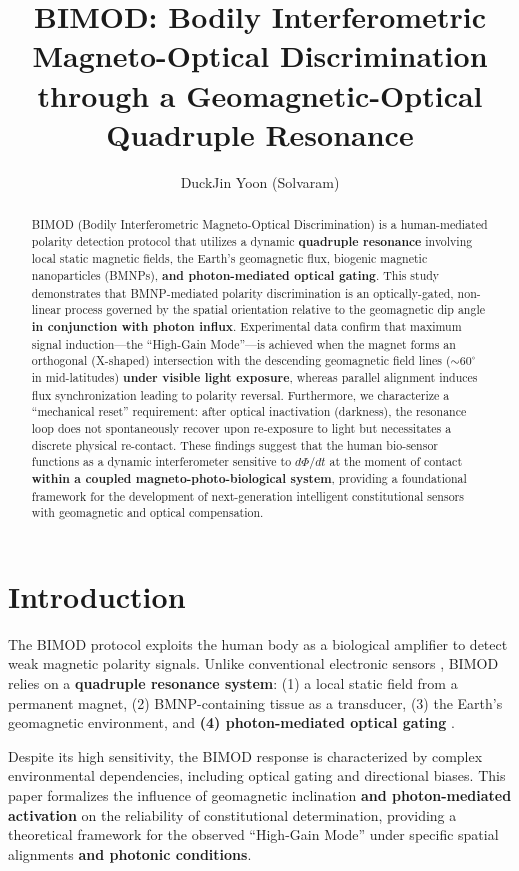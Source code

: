 \documentclass[12pt]{article}
\title{BIMOD: Bodily Interferometric Magneto-Optical Discrimination through a Geomagnetic-Optical Quadruple Resonance}
\author{DuckJin Yoon (Solvaram)}
\date{}
\begin{document}
\maketitle

\begin{abstract}
BIMOD (Bodily Interferometric Magneto-Optical Discrimination) is a human-mediated polarity detection protocol that utilizes a dynamic \textbf{quadruple resonance} involving local static magnetic fields, the Earth's geomagnetic flux, biogenic magnetic nanoparticles (BMNPs), \textbf{and photon-mediated optical gating}. This study demonstrates that BMNP-mediated polarity discrimination is an optically-gated, non-linear process governed by the spatial orientation relative to the geomagnetic dip angle \textbf{in conjunction with photon influx}. Experimental data confirm that maximum signal induction—the ``High-Gain Mode''—is achieved when the magnet forms an orthogonal (X-shaped) intersection with the descending geomagnetic field lines ($\sim60^\circ$ in mid-latitudes) \textbf{under visible light exposure}, whereas parallel alignment induces flux synchronization leading to polarity reversal. Furthermore, we characterize a ``mechanical reset'' requirement: after optical inactivation (darkness), the resonance loop does not spontaneously recover upon re-exposure to light but necessitates a discrete physical re-contact. These findings suggest that the human bio-sensor functions as a dynamic interferometer sensitive to $d\Phi/dt$ at the moment of contact \textbf{within a coupled magneto-photo-biological system}, providing a foundational framework for the development of next-generation intelligent constitutional sensors with geomagnetic and optical compensation.
\end{abstract}

\section{Introduction}
The BIMOD protocol exploits the human body as a biological amplifier to detect weak magnetic polarity signals. Unlike conventional electronic sensors \cite{hu2024}, BIMOD relies on a \textbf{quadruple resonance system}: (1) a local static field from a permanent magnet, (2) BMNP-containing tissue as a transducer, (3) the Earth's geomagnetic environment, and \textbf{(4) photon-mediated optical gating} \cite{xu2024}.

Despite its high sensitivity, the BIMOD response is characterized by complex environmental dependencies, including optical gating and directional biases. This paper formalizes the influence of geomagnetic inclination \textbf{and photon-mediated activation} on the reliability of constitutional determination, providing a theoretical framework for the observed ``High-Gain Mode'' under specific spatial alignments \textbf{and photonic conditions}.
\end{document}
